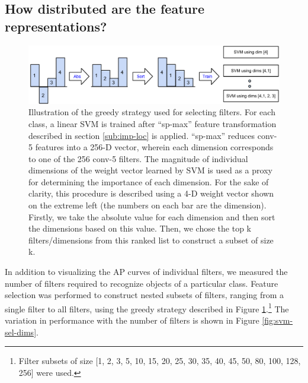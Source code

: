 \subsection{How distributed are the feature representations?}
\label{sub:how-many}
\begin{figure}[t!]
\centering
\includegraphics[scale=0.35]{images/how-many.pdf}
\caption{Illustration of the greedy strategy used for selecting filters. For each class, a linear SVM is trained after ``sp-max'' feature transformation described in section \ref{sub:imp-loc} is applied. ``sp-max''  reduces conv-5 features into a 256-D vector, wherein each dimension corresponds to one of the 256 conv-5 filters. The magnitude of individual dimensions of the weight vector learned by SVM is used as a proxy for determining the importance of each dimension. For the sake of clarity, this procedure is described using a 4-D weight vector shown on the extreme left (the numbers on each bar are the dimension). Firstly, we take the absolute value for each dimension and then sort the dimensions based on this value. Then, we chose the top k filters/dimensions from this ranked list to construct a subset of size k.}
\label{fig:sel-strategy}
\end{figure}

In addition to visualizing the AP curves of individual filters, we measured the number of filters required to recognize objects of a particular class.
Feature selection was performed to construct nested subsets of filters, ranging from a single filter to all filters, using the greedy strategy described in Figure \ref{fig:sel-strategy}.\footnote{Filter subsets of size [1, 2, 3, 5, 10, 15, 20, 25, 30, 35, 40, 45, 50, 80, 100, 128, 256] were used.}
The variation in performance with the number of filters is shown in Figure \ref{fig:svm-sel-dims}. 


